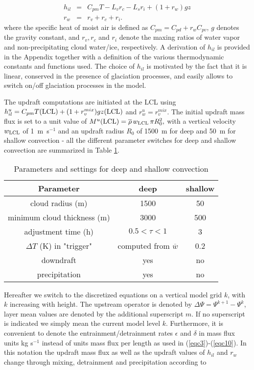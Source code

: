 \begin{eqnarray}
h_{il}&=& C_{pm} T - L_v r_c - L_s r_i + ( 1 + r_w ) g z\label{conv-eqh}\\
r_w&=&r_v+r_c+r_i\label{conv-eqr}.
\end{eqnarray}
\noindent
where the specific heat of moist air is defined as
$C_{pm}= C_{pd} + r_w C_{pv}$, $g$ denotes the gravity constant, and
$r_v, r_c$ and $r_i$ denote the maxing ratios of water vapor and
non-precipitating cloud water/ice, respectively.
 A derivation of
$h_{il}$ is provided in the Appendix together with a definition of the
various thermodynamic constants and functions used.
The choice of $h_{il}$  is motivated by the fact
that it is linear, conserved in the presence of glaciation
processes, and easily allows to switch on/off glaciation processes in
the model.

The updraft computations are initiated at the LCL using
$h_{il}^u=C_{pm} T({\rm LCL}) + ( 1 + r_v^{mix} ) g z({\rm LCL})$ and $r_w^u=
r_v^{mix}$. The initial updraft mass flux is set to a unit value of
$M^u({\rm LCL})=\overline{\rho}\,w_{\rm LCL}\,\pi R_0^2,$
with a vertical velocity $w_{\rm LCL}$ of 1~m~s$^{-1}$ and
an updraft radius $R_0$ of 1500~m for deep and 50~m for shallow convection -
all the different parameter switches for deep and shallow convection are
summarized in Table \ref{conv-table1}.

\begin{table}
\caption{Parameters and  settings for deep and shallow convection}
\label{conv-table1}
\begin{center}
\begin{tabular}{||c|c|c||} \hline
{\bf Parameter} &{\bf deep}&\bf{shallow}\\
\hline \hline
cloud radius (m)&1500&50\\
minimum cloud thickness (m)&3000&500\\
adjustment time (h)&$0.5 < \tau<1$&3\\
$\Delta T$ (K) in "trigger"&computed from $\overline{w}$&0.2\\
downdraft&yes&no\\
precipitation&yes&no\\
\hline
\hline
\end{tabular}
\end{center}
\end{table}

Hereafter we switch to the discretized equations
on a vertical model grid $k$, with $k$ increasing with height.
The upstream operator is denoted by $\Delta\Psi=\Psi^{k+1}-\Psi^k$,
layer mean values are denoted by the additional superscript $m$.
If no superscript
is indicated we simply mean the current model level $k$. Furthermore, it
is convenient to denote the entrainment/detrainment rates $\epsilon$
and $\delta$ in mass flux units  kg s$^{-1}$ instead of units mass flux per
length as used in (\ref{eqc3})-(\ref{eqc10}).
In this notation the updraft mass flux as well as the updraft values of $h_{il}$
and $r_w$ change through mixing, detrainment and precipitation according to

